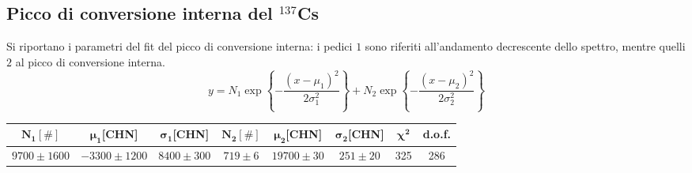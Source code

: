 \subsection{Picco di conversione interna del ${}^{137}$Cs}

Si riportano i parametri del fit del picco di conversione interna: i pedici $1$ sono riferiti all'andamento decrescente dello spettro, mentre quelli $2$ al picco di conversione interna.
$$y = N_1 \exp\left\{-\frac{(x-\mu_1)^2}{2\sigma_1^2}\right\} + N_2 \exp\left\{-\frac{(x-\mu_2)^2}{2\sigma_2^2}\right\}$$

\begin{table}[H]
    \centering
    \begin{tabular}{|c|c|c|c|c|c|c|c|}
    \hline
    $\mathbf{N_1 [\#]}$ & $\mathbf{\mu_1}$\textbf{[CHN]} & $\mathbf{\sigma_1}$\textbf{[CHN]} &
    $\mathbf{N_2 [\#]}$ & $\mathbf{\mu_2}$\textbf{[CHN]} & $\mathbf{\sigma_2}$\textbf{[CHN]} & $\mathbf{\chi^2}$ & \textbf{d.o.f.}\\
    \hline
    $9700\pm1600$ & $-3300\pm1200$ & $8400\pm300$ & $719\pm6$ & $19700\pm30$ & $251\pm20$ & 325 & 286 \\
    \hline
    \end{tabular}
\end{table}
%


